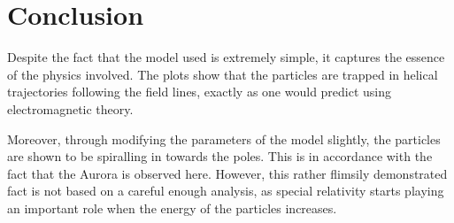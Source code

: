 \section{Conclusion}

Despite the fact that the model used is extremely simple, it captures the essence of the physics involved. The plots show that the particles are trapped in helical trajectories following the field lines, exactly as one would predict using electromagnetic theory. 

Moreover, through modifying the parameters of the model slightly, the particles are shown to be spiralling in towards the poles. This is in accordance with the fact that the Aurora is observed here. However, this rather flimsily demonstrated fact is not based on a careful enough analysis, as special relativity starts playing an important role when the energy of the particles increases.
